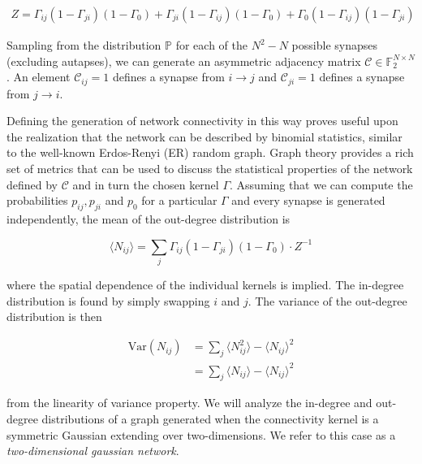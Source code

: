 \documentclass{ucetd}
\begin{document}
\begin{align*}
Z = \Gamma_{ij}(1-\Gamma_{ji})(1-\Gamma_{0}) + \Gamma_{ji}(1-\Gamma_{ij})(1-\Gamma_{0}) + \Gamma_{0}(1-\Gamma_{ij})(1-\Gamma_{ji})
\end{align*}

Sampling from the distribution $\mathbb{P}$ for each of the $N^{2} - N$ possible synapses (excluding autapses), we can generate an asymmetric adjacency matrix $\mathcal{C} \in \mathbb{F}_{2}^{N\times N}$. An element $\mathcal{C}_{ij} = 1$ defines a synapse from $i\rightarrow j$ and $\mathcal{C}_{ji} = 1$ defines a synapse from $j\rightarrow i$.

Defining the generation of network connectivity in this way proves useful upon the realization that the network can be described by binomial statistics, similar to the well-known Erdos-Renyi (ER) random graph. Graph theory provides a rich set of metrics that can be used to discuss the statistical properties of the network defined by $\mathcal{C}$ and in turn the chosen kernel $\Gamma$. Assuming that we can compute the probabilities $p_{ij}, p_{ji}$ and $p_{0}$ for a particular $\Gamma$ and every synapse is generated independently, the mean of the out-degree distribution is

\begin{equation}
\langle N_{ij} \rangle = \sum_{j} \Gamma_{ij}(1-\Gamma_{ji})(1-\Gamma_{0})\cdot Z^{-1}
\end{equation}

where the spatial dependence of the individual kernels is implied. The in-degree distribution is found by simply swapping $i$ and $j$. The variance of the out-degree distribution is then

\begin{align}
\mathrm{Var}(N_{ij}) &= \sum_{j} \langle N_{ij}^{2} \rangle - \langle N_{ij} \rangle ^{2} \\
&= \sum_{j} \langle N_{ij}\rangle - \langle N_{ij} \rangle ^{2} 
\end{align}

from the linearity of variance property. We will analyze the in-degree and out-degree distributions of a graph generated when the connectivity kernel is a symmetric Gaussian extending over two-dimensions. We refer to this case as a \emph{two-dimensional gaussian network}.
\end{document}
